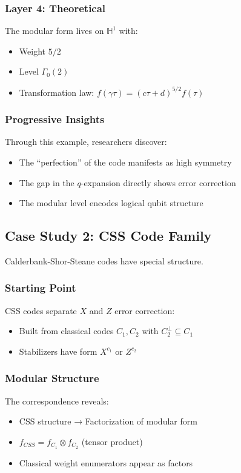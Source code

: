 \documentclass[11pt,a4paper]{article}
\newcommand{\HH}{\mathbb{H}}
\begin{document}
\subsubsection{Layer 4: Theoretical}
The modular form lives on $\HH^1$ with:
\begin{itemize}
\item Weight $5/2$
\item Level $\Gamma_0(2)$
\item Transformation law: $f(\gamma\tau) = (c\tau + d)^{5/2} f(\tau)$
\end{itemize}

\subsubsection{Progressive Insights}
Through this example, researchers discover:
\begin{itemize}
\item The ``perfection'' of the code manifests as high symmetry
\item The gap in the $q$-expansion directly shows error correction
\item The modular level encodes logical qubit structure
\end{itemize}

\subsection{Case Study 2: CSS Code Family}

Calderbank-Shor-Steane codes have special structure.

\subsubsection{Starting Point}
CSS codes separate $X$ and $Z$ error correction:
\begin{itemize}
\item Built from classical codes $C_1, C_2$ with $C_2^\perp \subseteq C_1$
\item Stabilizers have form $X^{c_1}$ or $Z^{c_2}$
\end{itemize}

\subsubsection{Modular Structure}
The correspondence reveals:
\begin{itemize}
\item CSS structure → Factorization of modular form
\item $f_{CSS} = f_{C_1} \otimes f_{C_2}$ (tensor product)
\item Classical weight enumerators appear as factors
\end{itemize}
\end{document}
